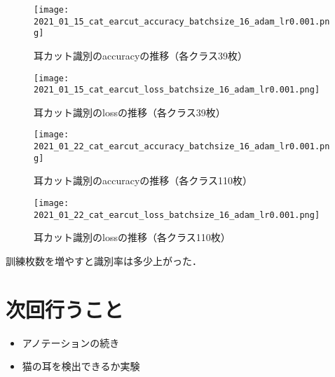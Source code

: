 \documentclass[twocolumn,a4paper,dvipdfmx]{ujarticle}     %
\begin{document}
\begin{figure}[H]
	\begin{center}
		\texttt{[image: 2021\_01\_15\_cat\_earcut\_accuracy\_batchsize\_16\_adam\_lr0.001.png]}
	\end{center}
	\caption{耳カット識別のaccuracyの推移（各クラス39枚）\label{cutaccuracy}}
\end{figure}

\begin{figure}[H]
	\begin{center}
		\texttt{[image: 2021\_01\_15\_cat\_earcut\_loss\_batchsize\_16\_adam\_lr0.001.png]}
	\end{center}
	\caption{耳カット識別のlossの推移（各クラス39枚）\label{cutloss}}
\end{figure}

\begin{figure}[H]
	\begin{center}
		\texttt{[image: 2021\_01\_22\_cat\_earcut\_accuracy\_batchsize\_16\_adam\_lr0.001.png]}
	\end{center}
	\caption{耳カット識別のaccuracyの推移（各クラス110枚）\label{cutaccuracy2}}
\end{figure}

\begin{figure}[H]
	\begin{center}
		\texttt{[image: 2021\_01\_22\_cat\_earcut\_loss\_batchsize\_16\_adam\_lr0.001.png]}
	\end{center}
	\caption{耳カット識別のlossの推移（各クラス110枚）\label{cutloss2}}
\end{figure}

訓練枚数を増やすと識別率は多少上がった．


\section{次回行うこと}
\begin{itemize}
	\item アノテーションの続き
	\item 猫の耳を検出できるか実験
\end{itemize}





%
\end{document}

